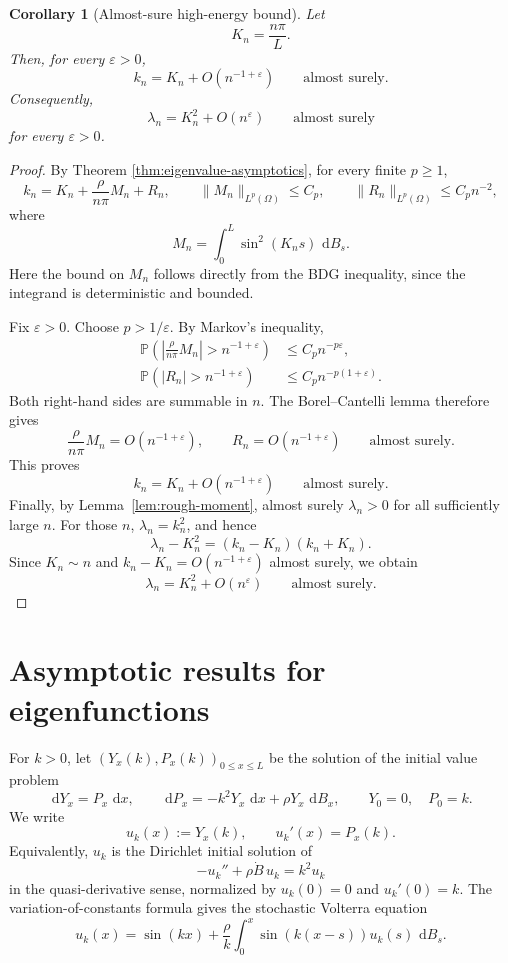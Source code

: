 \documentclass[11pt]{article}
\newtheorem{corollary}[theorem]{Corollary}
\newcommand{\dd}{\,\mathrm d}
\newcommand{\Prob}{\mathbb P}
\begin{document}
\begin{corollary}[Almost-sure high-energy bound]
\label{cor:as-bound}
Let
\[
    K_n=\frac{n\pi}{L}.
\]
Then, for every \(\varepsilon>0\),
\[
    k_n=K_n+O(n^{-1+\varepsilon})
    \qquad\text{almost surely}.
\]
Consequently,
\[
    \lambda_n=K_n^2+O(n^{\varepsilon})
    \qquad\text{almost surely}
\]
for every \(\varepsilon>0\).
\end{corollary}

\begin{proof}
By Theorem \ref{thm:eigenvalue-asymptotics}, for every finite \(p\ge1\),
\[
    k_n=K_n+\frac{\rho}{n\pi}M_n+R_n,
    \qquad
    \|M_n\|_{L^p(\Omega)}\le C_p,
    \qquad
    \|R_n\|_{L^p(\Omega)}\le C_p n^{-2},
\]
where
\[
    M_n=\int_0^L\sin^2(K_ns)\,\dd B_s .
\]
Here the bound on \(M_n\) follows directly from the BDG inequality, since the integrand is deterministic and bounded.

Fix \(\varepsilon>0\). Choose \(p>1/\varepsilon\). By Markov's inequality,
\[
\begin{aligned}
    \Prob\left(\left|\frac{\rho}{n\pi}M_n\right|>n^{-1+\varepsilon}\right)
    &\le C_p n^{-p\varepsilon},\\
    \Prob\left(|R_n|>n^{-1+\varepsilon}\right)
    &\le C_p n^{-p(1+\varepsilon)}.
\end{aligned}
\]
Both right-hand sides are summable in \(n\). The Borel--Cantelli lemma therefore gives
\[
    \frac{\rho}{n\pi}M_n=O(n^{-1+\varepsilon}),
    \qquad
    R_n=O(n^{-1+\varepsilon})
    \qquad\text{almost surely}.
\]
This proves
\[
    k_n=K_n+O(n^{-1+\varepsilon})
    \qquad\text{almost surely}.
\]
Finally, by Lemma~\ref{lem:rough-moment}, almost surely \(\lambda_n>0\) for all sufficiently large \(n\). For those \(n\), \(\lambda_n=k_n^2\), and hence
\[
    \lambda_n-K_n^2=(k_n-K_n)(k_n+K_n).
\]
Since \(K_n\sim n\) and \(k_n-K_n=O(n^{-1+\varepsilon})\) almost surely, we obtain
\[
    \lambda_n=K_n^2+O(n^{\varepsilon})
    \qquad\text{almost surely}.
\]
\end{proof}


\section{Asymptotic results for eigenfunctions}

For $k>0$, let $(Y_x(k),P_x(k))_{0\le x\le L}$ be the solution of the initial value problem
\[
    \dd Y_x=P_x\,\dd x,
    \qquad
    \dd P_x=-k^2Y_x\,\dd x+\rho Y_x\,\dd B_x,
    \qquad
    Y_0=0,\quad P_0=k.
\]
We write
\[
    u_k(x):=Y_x(k),
    \qquad u_k'(x)=P_x(k).
\]
Equivalently, $u_k$ is the Dirichlet initial solution of
\[
    -u_k''+\rho\dot B\,u_k=k^2u_k
\]
in the quasi-derivative sense, normalized by $u_k(0)=0$ and $u_k'(0)=k$. The variation-of-constants formula gives the stochastic Volterra equation
\begin{equation}\label{eq:volterra}
    u_k(x)=\sin(kx)+\frac{\rho}{k}\int_0^x\sin(k(x-s))u_k(s)\,\dd B_s.
\end{equation}
\end{document}

